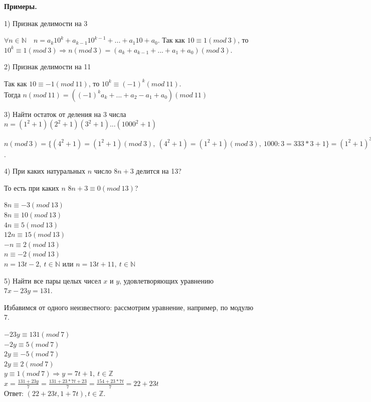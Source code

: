 \documentclass{article}
\begin{document}
    \textbf{Примеры.}

    1) Признак делимости на 3

    \( \forall n \in \mathbb{N}\quad n = a_k10^k + a_{k - 1}10^{k - 1} + ... + a_1 10 + a_0 \). Так как \(10 \equiv 1 (mod\ 3)\), то \(10^k \equiv 1 (mod\ 3) \Rightarrow n(mod\ 3) = (a_k + a_{k - 1} + ... + a_1 + a_0)(mod\ 3)\).

    2) Признак делимости на 11

    Так как \( 10 \equiv -1 (mod\ 11) \), то \( 10^k \equiv (-1)^k(mod\ 11) \).\\
    Тогда \( n(mod\ 11) = ((-1)^ka_k + ... + a_2 - a_1 + a_0)(mod\ 11) \)

    3) Найти остаток от деления на 3 числа \( n = (1^2 + 1)(2^2 + 1)(3^2 + 1)...(1000^2 + 1) \)

    \( n(mod\ 3) = \{(4^2 + 1) = (1^2 + 1)(mod\ 3),\ (4^2 + 1) = (1^2 + 1)(mod\ 3),\ 1000:3 = 333*3 + 1 \} = (1^2 + 1)^{334}(2^2 + 1)^{333}(3^2 + 1)^{333}(mod\ 3) \equiv (2)^{334}(2)^{333}(1)^{333}(mod\ 3) \equiv (2)^{667}(mod\ 3) \equiv (-1)^{667}(mod\ 3) \equiv -1(mod\ 3) \equiv 2(mod\ 3) \).

    4) При каких натуральных \(n\) число \(8n + 3\) делится на 13?

    То есть при каких \(n\) \(8n + 3 \equiv 0(mod\ 13)\)?

    \( 8n \equiv -3(mod\ 13) \)\\
    \( 8n \equiv 10(mod\ 13) \)\\
    \( 4n \equiv 5(mod\ 13) \)\\
    \( 12n \equiv 15(mod\ 13) \)\\
    \( -n \equiv 2(mod\ 13) \)\\
    \( n \equiv -2(mod\ 13) \)\\
    \( n = 13t - 2,\ t \in \mathbb{N} \) или \( n = 13t + 11,\ t \in \mathbb{N} \)
    
    5) Найти все пары целых чисел \(x\) и \(y\), удовлетворяющих уравнению \(7x - 23y = 131\).

    Избавимся от одного неизвестного: рассмотрим уравнение, например, по модулю 7.

    \( -23y \equiv 131(mod\ 7) \)\\
    \( -2y \equiv 5(mod\ 7) \)\\
    \( 2y \equiv -5(mod\ 7) \)\\
    \( 2y \equiv 2(mod\ 7) \)\\
    \( y \equiv 1(mod\ 7) \Rightarrow y = 7t + 1,\ t \in \mathbb{Z} \)\\
    \( x = \frac{131 + 23y}{7} = \frac{131 + 23*7t + 23}{7} = \frac{154 + 23*7t}{7} = 22 + 23t \)\\
    Ответ: \( (22 + 23t, 1 + 7t), t \in \mathbb{Z} \).
\end{document}
